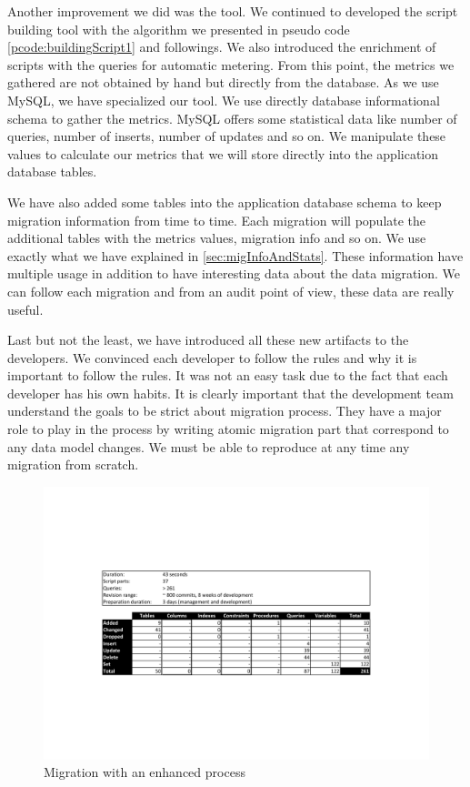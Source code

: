 Another improvement we did was the tool. We continued to developed the script building tool with the algorithm we presented in pseudo code \autoref{pcode:buildingScript1} and followings. We also introduced the enrichment of scripts with the queries for automatic metering. From this point, the metrics we gathered are not obtained by hand but directly from the database. As we use MySQL, we have specialized our tool. We use directly database informational schema to gather the metrics. MySQL offers some statistical data like number of queries, number of inserts, number of updates and so on. We manipulate these values to calculate our metrics that we will store directly into the application database tables.

We have also added some tables into the application database schema to keep migration information from time to time. Each migration will populate the additional tables with the metrics values, migration info and so on. We use exactly what we have explained in \autoref{sec:migInfoAndStats}. These information have multiple usage in addition to have interesting data about the data migration. We can follow each migration and from an audit point of view, these data are really useful.

Last but not the least, we have introduced all these new artifacts to the developers. We convinced each developer to follow the rules and why it is important to follow the rules. It was not an easy task due to the fact that each developer has his own habits. It is clearly important that the development team understand the goals to be strict about migration process. They have a major role to play in the process by writing atomic migration part that correspond to any data model changes. We must be able to reproduce at any time any migration from scratch.

\begin{figure}[h]
        \centering
        \includegraphics[scale=0.65]{images/Statistics_mig3.pdf}
        \caption{Migration with an enhanced process}
        \label{fig:Statistics_mig3}
\end{figure}


